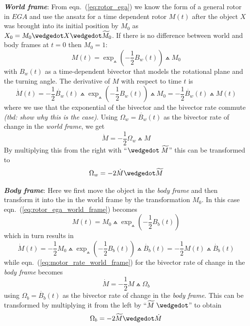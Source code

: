 \textbf{\emph{World frame}}: From eqn.~(\ref{eq:rotor_ega}) we know the form of a general
rotor in $EGA$ and use the ansatz for a time dependent rotor $M(t)$ after the object
$X$ was brought into its initial position by $M_0$ as $X_0 = M_0 \wedgedot X \wedgedot
\rev{M}_0$. If there is no difference between world and body frames at $t=0$ then $M_0=1$:
\begin{equation}
   M(t) = \exp_\wedgedot(-\frac{1}{2}B_w(t)) \wedgedot M_0
   \label{eq:rotor_ega_world_frame}
\end{equation}
with $B_w(t)$ as a time-dependent bivector that models the rotational plane and the
turning angle. The derivative of $M$ with respect to time $t$ is
\begin{equation}
   \dot{M}(t) = -\frac{1}{2} \dot{B_w}(t) \wedgedot
                \exp_\wedgedot (-\frac{1}{2}B_w(t)) \wedgedot M_0
              = -\frac{1}{2} \dot{B_w}(t) \wedgedot M(t)   
\end{equation}
where we use that the exponential of the bivector and the bivector rate commute
\emph{(tbd: show why this is the case)}. Using $\Omega_w = \dot{B_w}(t)$ as the bivector
rate of change in the \emph{world frame}, we get
\begin{equation}
   \dot{M} = -\frac{1}{2} \Omega_w \wedgedot M 
   \label{eq:motor_rate_world_frame}   
\end{equation}
By multiplying this from the right with ``$\wedgedot\;\rev{M}$'' this can be transformed
to
\begin{equation}
   \Omega_w = -2 \dot{M} \wedgedot \rev{M}
   \label{eq:bivector_rate_world_frame}
\end{equation}

\textbf{\emph{Body frame}}: Here we first move the object in the \emph{body frame} and
then transform it into the in the world frame by the transformation $M_0$. In this case
eqn.~(\ref{eq:rotor_ega_world_frame}) becomes 
\begin{equation}
   M(t) = M_0 \wedgedot \exp_\wedgedot(-\frac{1}{2}B_b(t))
   \label{eq:rotor_ega_body_frame}
\end{equation}
which in turn results in
\begin{equation}
   \dot{M}(t) = -\frac{1}{2} M_0 \wedgedot
                \exp_\wedgedot (-\frac{1}{2}B_b(t)) \wedgedot \dot{B_b}(t) 
              = -\frac{1}{2} M(t)  \wedgedot \dot{B_b}(t) 
\end{equation}
while eqn.~(\ref{eq:motor_rate_world_frame}) for the bivector rate of change in the
\emph{body frame} becomes
\begin{equation}
   \dot{M} = -\frac{1}{2} M \wedgedot \Omega_b  
   \label{eq:motor_rate_body_frame}   
\end{equation}
using $\Omega_b = \dot{B_b}(t)$ as the bivector rate of change in the \emph{body frame}.
This can be transformed by multiplying it from the left by ``$\rev{M}\;\wedgedot$'' to
obtain
\begin{equation}
   \Omega_b = -2 \rev{M} \wedgedot \dot{M}
   \label{eq:bivector_rate_body_frame}
\end{equation}


